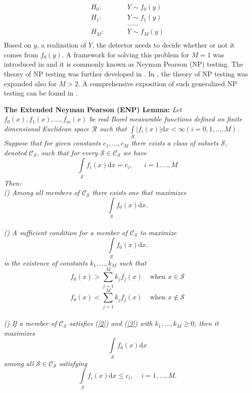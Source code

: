 \documentclass[12pt,journal,a4paper,twoside,onecolumn]{IEEEtran}
\newcommand{\rmnum}[1]{\romannumeral #1}
\begin{document}
\begin{spacing}{2.5}
  \begin{equation}
\label{equ:hypothesis}
\begin{split}
H_0:\;\;\;\;\;\;\;\;\;&Y \sim f_0(y) \\
H_1:\;\;\;\;\;\;\;\;\;&Y \sim f_1(y)\\
&......\\
H_M:\;\;\;\;\;\;\;\;\;&Y \sim f_M(y)\\
\end{split}
\end{equation}
Based on $y$, a realization of $Y$, the detector needs to decide whether or not it comes from $f_0(y)$. A framework for solving this problem for $M=1$ was introduced in \cite{neyman1933problem} and it is commonly known as Neyman Pearson (NP) testing. The theory of NP testing was further developed in \cite{wald1939contributions}. In \cite{dantzig1951fundamental}, the theory of NP testing was  expanded also for $M>2$. A comprehensive exposition of such generalized NP testing can be found in \cite{LehmannTest}.

\noindent  \textbf{The Extended Neyman Pearson (ENP) Lemma:}
\textit{
Let $f_0(x), f_1(x), ..., f_{m}(x)$ be real Borel measurable functions  defined on finite dimensional  Euclidean space $\mathcal{R}$ such that $\int \limits_R | f_i(x)|\mathrm{d}x < \infty (i=0, 1,...,M)$.  Suppose that for given constants $c_1,...,c_M$ there exists a class of subsets $\mathcal{S}$, denoted $\mathcal{C}_\mathcal{S}$, such that for every $\mathcal{S} \in \mathcal{C}_\mathcal{S}$ we have
\begin{equation}
\label{one}
\int\limits_\mathcal{S} f_i(x)\mathrm{d}x = c_i, \;\;\;\;\;\;i=1,...,M
\end{equation}
Then:
\\\textnormal{(\rmnum{1})} Among all members of $\mathcal{C}_\mathcal{S}$ there exists one that maximizes
\[
\int \limits_\mathcal{S} f_{0}(x)\mathrm{d}x.
\]
\\\textnormal{(\rmnum{2})} A sufficient condition for a member of $\mathcal{C}_\mathcal{S}$ to maximize
\[
\int \limits_\mathcal{S} f_{0}(x)\mathrm{d}x.
\]
is the existence of constants $k_1,...,k_M$ such that
\begin{equation}
\label{2}
f_{0}(x)>\sum\limits_{j=1}^M k_j f_j(x)\;\;\;\;\text{when $x \in \mathcal{S}$}
\end{equation}
\begin{equation}
\label{3}
f_{0}(x)<\sum\limits_{j=1}^M k_j f_j(x)\;\;\;\;\text{when $x \notin \mathcal{S}$}
\end{equation}
\\\textnormal{(\rmnum{3})} If a member of $\mathcal{C}_\mathcal{S}$ satisfies  \textnormal{(\ref{2})} and \textnormal{(\ref{3})} with $k_1,...,k_M\geq0$, then it maximizes
\begin{equation}
\label{4}
\int \limits_\mathcal{S} f_{0}(x)\mathrm{d}x
\end{equation}
among all $\mathcal{S} \in \mathcal{C}_{\mathcal{S}}$ satisfying
\begin{equation}
\label{5}
\int \limits_\mathcal{S} f_i(x)\mathrm{d}x\leq c_i,\;\;\;\;i=1,...,M.
\end{equation}
}


\end{spacing}
\end{document}
